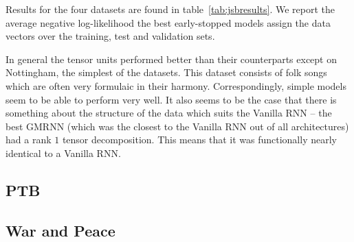 Results for the four datasets are found in table~\ref{tab:jsbresults}. We report the average
negative log-likelihood the best early-stopped models assign the data vectors over
the training, test and validation sets.

In general the tensor units performed better than their counterparts except on
Nottingham, the simplest of the datasets. This dataset consists of folk songs which
are often very formulaic in their harmony. Correspondingly, simple models seem to be able to
perform very well. It also seems to be the case that there is something about the structure
of the data which suits the Vanilla RNN -- the best GMRNN (which was the closest to the
Vanilla RNN out of all architectures) had a rank \(1\) tensor decomposition. This means
that it was functionally nearly identical to a Vanilla RNN.

\subsection{PTB}
\subsection{War and Peace}